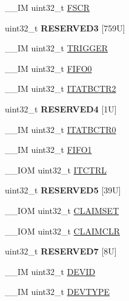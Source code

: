 \begin{DoxyCompactItemize}
\item 
\+\_\+\+\_\+\+IM uint32\+\_\+t \mbox{\hyperlink{struct_t_p_i___type_a36370b2b0879b7b497f6dd854ba02873}{F\+S\+CR}}
\item 
\mbox{\label{struct_t_p_i___type_a650f89ad335eff97db39beae568590a3}} 
uint32\+\_\+t {\bfseries R\+E\+S\+E\+R\+V\+E\+D3} \mbox{[}759\+U\mbox{]}
\item 
\+\_\+\+\_\+\+IM uint32\+\_\+t \mbox{\hyperlink{struct_t_p_i___type_a5590387d8f44b477fd69951a737b0d7e}{T\+R\+I\+G\+G\+ER}}
\item 
\+\_\+\+\_\+\+IM uint32\+\_\+t \mbox{\hyperlink{struct_t_p_i___type_ace73d78eff029b698e11cd5cf3efaf94}{F\+I\+F\+O0}}
\item 
\+\_\+\+\_\+\+IM uint32\+\_\+t \mbox{\hyperlink{struct_t_p_i___type_a97fb8816ad001f4910de095aa17d9db5}{I\+T\+A\+T\+B\+C\+T\+R2}}
\item 
\mbox{\label{struct_t_p_i___type_a1defe18fe95571e383d754b13d3f6c51}} 
uint32\+\_\+t {\bfseries R\+E\+S\+E\+R\+V\+E\+D4} \mbox{[}1\+U\mbox{]}
\item 
\+\_\+\+\_\+\+IM uint32\+\_\+t \mbox{\hyperlink{struct_t_p_i___type_a9954c088735caa505adc113f6c64d812}{I\+T\+A\+T\+B\+C\+T\+R0}}
\item 
\+\_\+\+\_\+\+IM uint32\+\_\+t \mbox{\hyperlink{struct_t_p_i___type_abad7737b3d46cc6d4813d37171d29745}{F\+I\+F\+O1}}
\item 
\+\_\+\+\_\+\+I\+OM uint32\+\_\+t \mbox{\hyperlink{struct_t_p_i___type_ae6b7f224b1c19c636148f991cc8db611}{I\+T\+C\+T\+RL}}
\item 
\mbox{\label{struct_t_p_i___type_ae024db200dd6038b38de69abd513f40c}} 
uint32\+\_\+t {\bfseries R\+E\+S\+E\+R\+V\+E\+D5} \mbox{[}39\+U\mbox{]}
\item 
\+\_\+\+\_\+\+I\+OM uint32\+\_\+t \mbox{\hyperlink{struct_t_p_i___type_a974d17c9a0b0b1b894e9707d158b0fbe}{C\+L\+A\+I\+M\+S\+ET}}
\item 
\+\_\+\+\_\+\+I\+OM uint32\+\_\+t \mbox{\hyperlink{struct_t_p_i___type_a1f74caab7b0a7afa848c63ce8ebc6a6f}{C\+L\+A\+I\+M\+C\+LR}}
\item 
\mbox{\label{struct_t_p_i___type_a49f51f1c090eb2cda74363bbfc3b385b}} 
uint32\+\_\+t {\bfseries R\+E\+S\+E\+R\+V\+E\+D7} \mbox{[}8\+U\mbox{]}
\item 
\+\_\+\+\_\+\+IM uint32\+\_\+t \mbox{\hyperlink{struct_t_p_i___type_aaed316dacef669454fa035e04ee90eca}{D\+E\+V\+ID}}
\item 
\+\_\+\+\_\+\+IM uint32\+\_\+t \mbox{\hyperlink{struct_t_p_i___type_a81f643aff0e4bed2638a618e2b1fd3bb}{D\+E\+V\+T\+Y\+PE}}
\end{DoxyCompactItemize}


